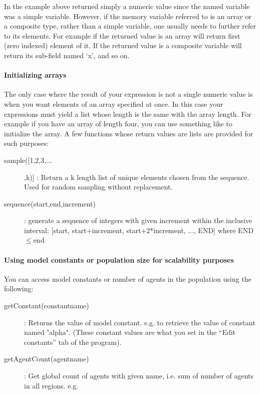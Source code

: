 \documentclass[10pt]{article}
\begin{document}
In the example above  returned simply a numeric value since the named variable was a simple variable. However, if the memory variable referred to is an array or a composite type, rather than a simple variable, one usually needs to further refer to its elements. For example if the returned value is an array  will return first (zero indexed) element of it. If the returned value is a composite variable  will return its sub-field named `x', and so on.

\paragraph{Initializing arrays}
The only case where the result of your expression is not a single numeric value is when you want elements of an array specified at once. In this case your expressions must yield a list whose length is the same with the array length. For example if you have an array of length four, you can use something like \example{[1,2,3,4]} to initialize the array. A few functions whose return values are lists are provided for such purposes:
\begin{description}  
   \item[sample([1,2,3,...],k)] : Return a k length list of unique elements chosen from the sequence. Used for random sampling without replacement.
   \item[sequence(start,end,increment)] : generate a sequence of integers with given increment within the inclusive interval: [start, start+increment, start+2*increment, ..., END] where END$\le$end.
\end{description}
\paragraph{Using model constants or population size for scalability purposes}
You can access model constants or number of agents in the population using the following:
\begin{description}
   \item[getConstant(constantname)]: Returns the value of model constant. e.g.  to retrieve the value of constant named "alpha". (These constant values are what you set in the ``Edit constants'' tab of the program).
   \item[getAgentCount(agentname)]: Get global count of agents with given name, i.e. sum of number of agents in all regions. e.g. 
\end{description}
\end{document}
